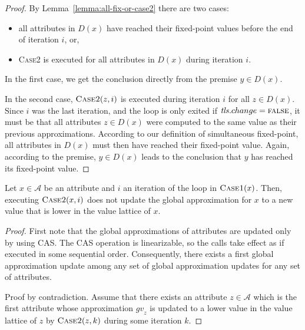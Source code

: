 {\begin{proof}
  By Lemma~\ref{lemma:all-fix-or-case2} there are two cases:

  \begin{itemize}
    \item all attributes in $D(x)$ have reached their fixed-point values
      before the end of iteration $i$, or,
    \item \textsc{Case2} is executed for all attributes in $D(x)$ during iteration $i$.
  \end{itemize}

  In the first case, we get the conclusion directly from the premise $y \in D(x)$.

  In the second case, $\textsc{Case2}(z, i)$ is executed during iteration $i$ for all $z \in D(x)$.
  Since $i$ was the last iteration, and the loop is only exited if $\mathit{tls}.change = \textsc{false}$,
  it must be
  that all attributes $z \in D(x)$ were computed to the same value as their previous approximations.
  According to our definition of simultaneous fixed-point, all attributes in $D(x)$ must then have
  reached their fixed-point value.  Again, according to the premise, $y \in D(x)$ leads to the
  conclusion that $y$ has reached its fixed-point value.  \end{proof}


\begin{lemma}
  Let $x \in \mathcal{A}$ be an attribute
  and $i$ an iteration of the loop in $\textsc{Case1}(x)$.
  Then, executing $\textsc{Case2}(x, i)$ does not update the global approximation for $x$
  to a new value that is lower in the value lattice of $x$.
  \label{lemma:case2-monotonic}
\end{lemma}

\begin{proof}
  First note that the global approximations of attributes are updated only by using CAS. The
  CAS operation is linearizable, so the calls take effect as if executed in some sequential order.
  Consequently, there exists a first global approximation update among any set of
  global approximation updates for any set of attributes.

  Proof by contradiction.  Assume that there exists an attribute $z \in \mathcal{A}$ which is the
  first attribute whose approximation $\mathit{gv}_z$  is updated to a lower value in the value lattice of
  $z$ by $\textsc{Case2}(z, k)$ during some iteration $k$.


\end{proof}}
